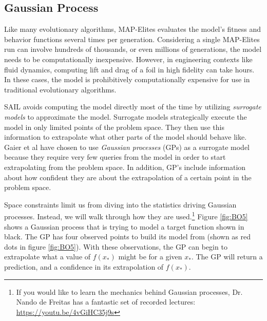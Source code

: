 \documentclass{sig-alternate}
\begin{document}
\subsection{Gaussian Process}
\label{gaussianProcess}
Like many evolutionary algorithms, MAP-Elites evaluates the model's fitness and behavior functions several times per generation.
Considering a single MAP-Elites run can involve hundreds of thousands, or even millions of generations, the model needs to be computationally inexpensive.
However, in engineering contexts like fluid dynamics, computing lift and drag of a foil in high fidelity can take hours.
In these cases, the model is prohibitively computationally expensive for use in traditional evolutionary algorithms.

SAIL avoids computing the model directly most of the time by utilizing \textit{surrogate models} to approximate the model.
Surrogate models strategically execute the model in only limited points of the problem space.
They then use this information to extrapolate what other parts of the model should behave like.
Gaier et al have chosen to use \textit{Gaussian processes} (GPs) as a surrogate model because they require very few queries from the model in order to start extrapolating from the problem space.
In addition, GP's include information about how confident they are about the extrapolation of a certain point in the problem space.


Space constraints limit us from diving into the statistics driving Gaussian processes.
Instead, we will walk through how they are used.\footnote{If you would like to learn the mechanics behind Gaussian processes, Dr. Nando de Freitas has a fantastic set of recorded lectures:
\url{https://youtu.be/4vGiHC35j9s}
}
Figure \ref{fig:BO5} shows a Gaussian process that is trying to model a target function shown in black.
The GP has four observed points to build its model from (shown as red dots in figure \ref{fig:BO5}).
With these observations, the GP can begin to extrapolate what a value of $f(x_{*})$ might be for a given $x_{*}$.
The GP will return a prediction, and a confidence in its extrapolation of $f(x_{*})$.
\end{document}
